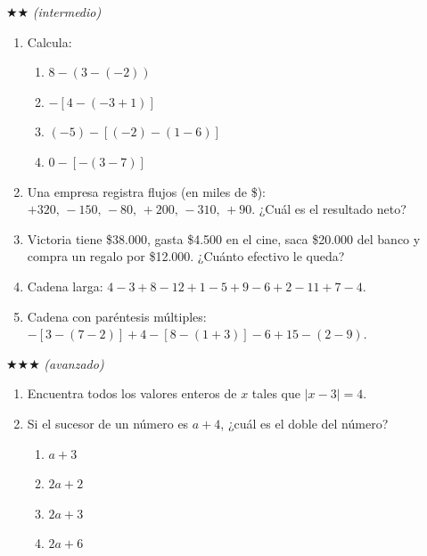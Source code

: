 \documentclass[11pt, letterpaper]{article}
\begin{document}
$\bigstar\bigstar$ \textit{(intermedio)}

\begin{enumerate}[label=\textbf{\arabic*.}, leftmargin=*, resume]
  \item Calcula:
  \begin{multicols}{2}
  \begin{enumerate}[label=\alph*)]
    \item $8-(3-(-2))$
    \item $-[4-(-3+1)]$
    \item $(-5)-[(-2)-(1-6)]$
    \item $0-[-(3-7)]$
  \end{enumerate}
  \end{multicols}

  \item Una empresa registra flujos (en miles de \$): $+320,\,-150,\,-80,\,+200,\,-310,\,+90$. ¿Cu\'al es el resultado neto?

  \item Victoria tiene \$38.000, gasta \$4.500 en el cine, saca \$20.000 del banco y compra un regalo por \$12.000. ¿Cu\'anto efectivo le queda?

  \item Cadena larga: $4-3+8-12+1-5+9-6+2-11+7-4$.

  \item Cadena con par\'entesis m\'ultiples: $-[3-(7-2)]+4-[8-(1+3)]-6+15-(2-9)$.
\end{enumerate}

$\bigstar\bigstar\bigstar$ \textit{(avanzado)}

\begin{enumerate}[label=\textbf{\arabic*.}, leftmargin=*, resume]
  \item Encuentra todos los valores enteros de $x$ tales que $|x-3|=4$.

  \item Si el sucesor de un n\'umero es $a+4$, ¿cu\'al es el doble del n\'umero?
  \begin{multicols}{4}
  \begin{enumerate}[label=\Alph*)]
    \item $a+3$
    \item $2a+2$
    \item $2a+3$
    \item $2a+6$
  \end{enumerate}
  \end{multicols}
\end{enumerate}
\end{document}
